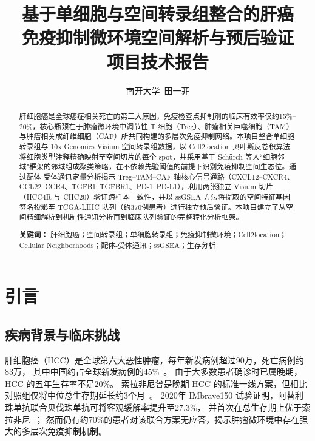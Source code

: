 \documentclass[12pt, a4paper]{ctexart}
\title{
    \vspace{-1cm}
    \textbf{基于单细胞与空间转录组整合的肝癌\\
    免疫抑制微环境空间解析与预后验证}\\[0.5em]
    \large 项目技术报告
}
\author{南开大学\ 田一菲}
\date{}
\begin{document}
\maketitle
\thispagestyle{empty}

\begin{abstract}
肝细胞癌是全球癌症相关死亡的第三大原因，免疫检查点抑制剂的临床有效率仅约15\%--20\%，核心瓶颈在于肿瘤微环境中调节性 T 细胞（Treg）、肿瘤相关巨噬细胞（TAM）与肿瘤相关成纤维细胞（CAF）所共同构建的多层次免疫抑制网络。本项目整合单细胞转录组与 10x Genomics Visium 空间转录组数据，以 Cell2location 贝叶斯反卷积算法将细胞类型注释精确映射至空间切片的每个 spot，并采用基于 Schürch 等人``细胞邻域"框架的邻域组成聚类策略，在不依赖先验阈值的前提下识别免疫抑制空间生态位。通过配体-受体通讯定量分析揭示 Treg--TAM--CAF 轴核心信号通路（CXCL12--CXCR4、CCL22--CCR4、TGFB1--TGFBR1、PD-1--PD-L1），利用两张独立 Visium 切片（HCC4R 与 CHC20）验证跨样本一致性，并以 ssGSEA 方法将提取的空间特征基因签名投影至 TCGA-LIHC 队列（约370例患者）进行独立预后验证。本项目建立了从空间精细解析到机制性通讯分析再到临床队列验证的完整转化分析框架。

\noindent\textbf{关键词：}
肝细胞癌；空间转录组；单细胞转录组；免疫抑制微环境；Cell2location；
Cellular Neighborhoods；配体-受体通讯；ssGSEA；生存分析
\end{abstract}

\newpage
\tableofcontents
\newpage


\section{引言}

\subsection{疾病背景与临床挑战}

肝细胞癌（HCC）是全球第六大恶性肿瘤，每年新发病例超过90万，死亡病例约83万，
其中中国约占全球新发病例的45\%~\citep{llovet2021hepatocellular,chen2016liver}。
由于大多数患者确诊时已属晚期，HCC 的五年生存率不足20\%。
索拉非尼曾是晚期 HCC 的标准一线方案，但相比对照组仅将中位总生存期延长约3个月~\citep{llovet2008sorafenib}。
2020年 IMbrave150 试验证明，阿替利珠单抗联合贝伐珠单抗可将客观缓解率提升至27.3\%，
并首次在总生存期上优于索拉非尼~\citep{finn2020atezolizumab}；
然而仍有约70\%的患者对该联合方案无应答，揭示肿瘤微环境中存在强大的多层次免疫抑制机制。
\end{document}
